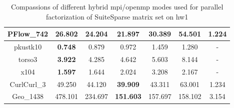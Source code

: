 \begin{table}[h!]
\begin{tabular}{|c|c|c|c|c|c|c|}
PFlow\_742                                            & 26.802                                                    & 24.204                                                     & \textbf{21.897}                                           & 30.389                                                     & 54.501                                                     & 1.224                                                            \\ \hline
pkustk10                                              & \textbf{0.748}                                            & 0.879                                                      & 0.972                                                     & 1.459                                                      & 1.280                                                      & -                                                                \\ \hline
torso3                                                & \textbf{3.922}                                            & 4.285                                                      & 4.642                                                     & 5.603                                                      & 8.144                                                      & -                                                                \\ \hline
x104                                                  & \textbf{1.597}                                            & 1.644                                                      & 2.024                                                     & 3.208                                                      & 2.167                                                      & -                                                                \\ \hline
CurlCurl\_3                                           & 49.250                                                    & 44.120                                                     & \textbf{39.909}                                           & 43.311                                                     & 63.001                                                     & 1.234                                                            \\ \hline
Geo\_1438                                             & 478.101                                                   & 234.697                                                    & \textbf{151.603}                                          & 157.697                                                    & 158.102                                                    & 3.154                                                            \\ \hline
\end{tabular}
\caption{Compassions of different hybrid \acrshort{mpi}/\acrshort{openmp} modes used for parallel factorization of SuiteSparse matrix set on \gls{hw1}}
\label{fig:mpi-omp-suitesparse-hw1}
\end{table}




